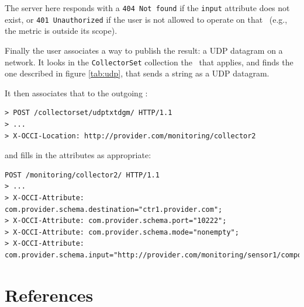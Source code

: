 \documentclass[12pt]{article}  %
\begin{document}
{The server here responds with a {\tt 404 Not found} if the {\tt input} attribute does not exist, or {\tt 401 Unauthorized} if the user is not allowed to operate on that \rs\ (e.g., the metric is outside its scope).

Finally the user associates a way to publish the result: a UDP datagram on a network. It looks in the {\tt CollectorSet} collection the \mi\ that applies, and finds the one described in figure \ref{tab:udp}, that sends a string as a UDP datagram.

\begin{table}
\scriptsize
{}

\caption{Attributes defined for the {\tt udptxtdgm} mixin \label{tab:udp}}
\end {table}

It then associates that \mi to the outgoing \coll:

{\scriptsize
\begin{verbatim}
> POST /collectorset/udptxtdgm/ HTTP/1.1
> ...
> X-OCCI-Location: http://provider.com/monitoring/collector2
\end{verbatim}
 }
and fills in the attributes as appropriate:

\begin{verbatim}
POST /monitoring/collector2/ HTTP/1.1
> ...
> X-OCCI-Attribute: com.provider.schema.destination="ctr1.provider.com";
> X-OCCI-Attribute: com.provider.schema.port="10222";
> X-OCCI-Attribute: com.provider.schema.mode="nonempty";
> X-OCCI-Attribute: com.provider.schema.input="http://provider.com/monitoring/sensor1/compoutput";
\end{verbatim}




\section{References}

}
\end{document}
